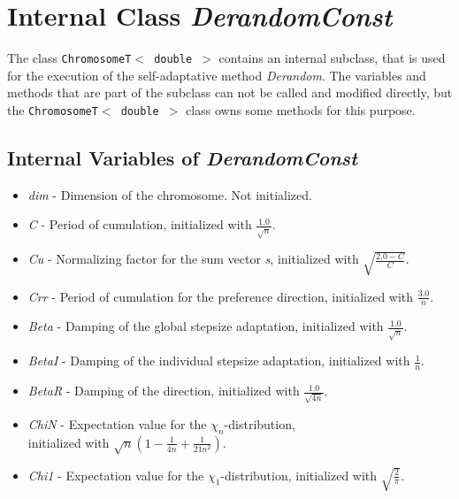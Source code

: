 \section{Internal Class {\em DerandomConst}}

The class {\tt ChromosomeT$<$ double $>$} contains an internal
subclass, that is used for the execution of the self-adaptative
method {\em Derandom}. The variables and methods that are
part of the subclass can not be called and modified directly, but
the {\tt ChromosomeT$<$ double $>$} class owns some methods for this
purpose. 

\subsection{Internal Variables of {\em DerandomConst}}

\begin{itemize}
\item {\em dim} - 
 Dimension of the chromosome. Not initialized. 

\item {\em C} -
 Period of cumulation, initialized with $\frac{1.0}{\sqrt{n}}$.

\item {\em Cu} -
 Normalizing factor for the sum vector {\em s}, initialized with 
 $\sqrt{\frac{2.0 - C}{C}}$.

\item {\em Crr} -
 Period of cumulation for the preference direction, initialized with 
 $\frac{3.0}{n}$. 

\item {\em Beta} -
 Damping of the global stepsize adaptation, initialized 
 with $\frac{1.0}{\sqrt{n}}$.

\item {\em BetaI} -
 Damping of the individual stepsize adaptation, initialized with
 $\frac{1}{n}$.

\item {\em BetaR} -
 Damping of the direction, initialized with $\frac{1.0}{\sqrt{4n}}$. 

\item {\em ChiN} -
 Expectation value for the $\chi_n$-distribution,\\ initialized with
 $\sqrt{n}(1 - \frac{1}{4n} + \frac{1}{21n^2})$.

\item {\em Chi1} -
 Expectation value for the $\chi_1$-distribution, initialized with
 $\sqrt{\frac{2}{\pi}}$.

\end{itemize}

